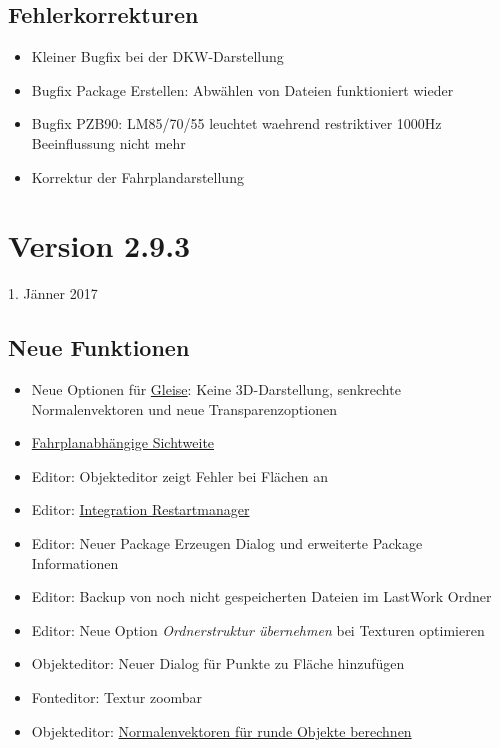 \subsection{Fehlerkorrekturen}
\begin{itemize}
\item Kleiner Bugfix bei der DKW-Darstellung
\item Bugfix Package Erstellen: Abwählen von Dateien funktioniert wieder
\item Bugfix PZB90: LM85/70/55 leuchtet waehrend restriktiver 1000Hz Beeinflussung nicht mehr
\item Korrektur der Fahrplandarstellung
\end{itemize}


\section{Version 2.9.3}\hfill 1. Jänner 2017
\subsection{Neue Funktionen}
\begin{itemize}
\item Neue Optionen für \hyperref[sec:editor-gleise]{Gleise}: Keine 3D-Darstellung, senkrechte Normalenvektoren und neue Transparenzoptionen
\item \hyperref[sec:sim-optionen-special]{Fahrplanabhängige Sichtweite}
\item Editor: Objekteditor zeigt Fehler bei Flächen an
\item Editor: \hyperref[sec:sec:editor-lastwork]{Integration Restartmanager}
\item Editor: Neuer Package Erzeugen Dialog und erweiterte Package Informationen
\item Editor: Backup von noch nicht gespeicherten Dateien im LastWork Ordner
\item Editor: Neue Option \emph{Ordnerstruktur übernehmen} bei Texturen optimieren
\item Objekteditor: Neuer Dialog für Punkte zu Fläche hinzufügen
\item Fonteditor: Textur zoombar
\item Objekteditor: \hyperref[sec:editor-obj-l3dobj-normalen]{Normalenvektoren für runde Objekte berechnen}
\end{itemize}


